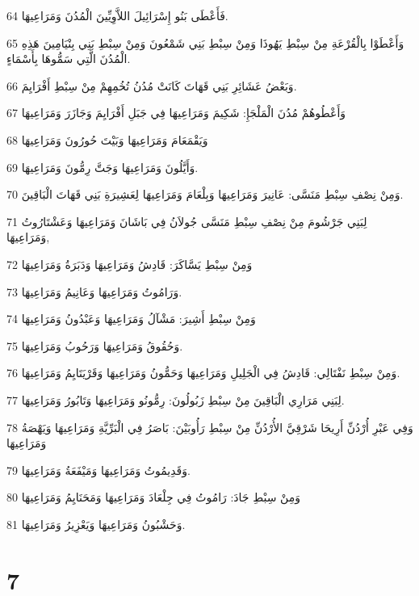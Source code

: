\par 64 فَأَعْطَى بَنُو إِسْرَائِيلَ اللاَّوِيِّينَ الْمُدُنَ وَمَرَاعِيهَا.
\par 65 وَأَعْطَوْا بِالْقُرْعَةِ مِنْ سِبْطِ يَهُوذَا وَمِنْ سِبْطِ بَنِي شَمْعُونَ وَمِنْ سِبْطِ بَنِي بِنْيَامِينَ هَذِهِ الْمُدُنَ الَّتِي سَمُّوهَا بِأَسْمَاءٍ.
\par 66 وَبَعْضُ عَشَائِرِ بَنِي قَهَاتَ كَانَتْ مُدُنُ تُخُمِهِمْ مِنْ سِبْطِ أَفْرَايِمَ.
\par 67 وَأَعْطُوهُمْ مُدُنَ الْمَلْجَإِ: شَكِيمَ وَمَرَاعِيهَا فِي جَبَلِ أَفْرَايِمَ وَجَازَرَ وَمَرَاعِيهَا
\par 68 وَيَقْمَعَامَ وَمَرَاعِيهَا وَبَيْتَ حُورُونَ وَمَرَاعِيهَا
\par 69 وَأَيَّلُونَ وَمَرَاعِيهَا وَجَتَّ رِمُّونَ وَمَرَاعِيهَا.
\par 70 وَمِنْ نِصْفِ سِبْطِ مَنَسَّى: عَانِيرَ وَمَرَاعِيهَا وَبِلْعَامَ وَمَرَاعِيهَا لِعَشِيرَةِ بَنِي قَهَاتَ الْبَاقِينَ.
\par 71 لِبَنِي جَرْشُومَ مِنْ نِصْفِ سِبْطِ مَنَسَّى جُولاَنُ فِي بَاشَانَ وَمَرَاعِيهَا وَعَشْتَارُوتُ وَمَرَاعِيهَا,
\par 72 وَمِنْ سِبْطِ يَسَّاكَرَ: قَادِشُ وَمَرَاعِيهَا وَدَبَرَةُ وَمَرَاعِيهَا
\par 73 وَرَامُوتُ وَمَرَاعِيهَا وَعَانِيمُ وَمَرَاعِيهَا.
\par 74 وَمِنْ سِبْطِ أَشِيرَ: مَشْآلُ وَمَرَاعِيهَا وَعَبْدُونُ وَمَرَاعِيهَا
\par 75 وَحُقُوقُ وَمَرَاعِيهَا وَرَحُوبُ وَمَرَاعِيهَا.
\par 76 وَمِنْ سِبْطِ نَفْتَالِي: قَادِشُ فِي الْجَلِيلِ وَمَرَاعِيهَا وَحَمُّونُ وَمَرَاعِيهَا وَقَرْيَتَايِمُ وَمَرَاعِيهَا.
\par 77 لِبَنِي مَرَارِي الْبَاقِينَ مِنْ سِبْطِ زَبُولُونَ: رِمُّونُو وَمَرَاعِيهَا وَتَابُورُ وَمَرَاعِيهَا.
\par 78 وَفِي عَبْرِ أُرْدُنِّ أَرِيحَا شَرْقِيَّ الأُرْدُنِّ مِنْ سِبْطِ رَأُوبَيْنَ: بَاصَرُ فِي الْبَرِّيَّةِ وَمَرَاعِيهَا وَيَهْصَةُ وَمَرَاعِيهَا
\par 79 وَقَدِيمُوتُ وَمَرَاعِيهَا وَمَيْفَعَةُ وَمَرَاعِيهَا.
\par 80 وَمِنْ سِبْطِ جَادَ: رَامُوتُ فِي جِلْعَادَ وَمَرَاعِيهَا وَمَحَنَايِمُ وَمَرَاعِيهَا
\par 81 وَحَشْبُونُ وَمَرَاعِيهَا وَيَعْزِيرُ وَمَرَاعِيهَا.

\chapter{7}

